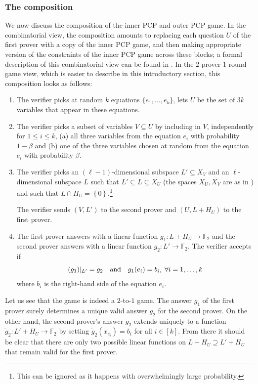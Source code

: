 \documentclass{toc}
\newcommand\set[1]{{\left\{ #1 \right\}}}
\renewcommand\leq{\leqslant}
\renewcommand\subset{\subseteq}
\renewcommand\supset{\supseteq}
\def\F{\mathbb{F}}
\begin{document}
\subsubsection{The composition}
\def\F{\mathbb{F}}
We now discuss the composition of the inner PCP and outer PCP game. In the combinatorial view, the composition amounts to
replacing each question $U$ of the first prover with a copy of the inner PCP game, and then making appropriate version of
the constraints of the inner PCP game across these blocks; a formal description of this combinatorial view can be found
in . In the $2$-prover-$1$-round game view, which is easier to describe in this introductory section,
this composition looks as follows:
\begin{enumerate}
\item The verifier picks at random $k$ equations $\{e_1,\ldots, e_k \}$, lets $U$ be the set of $3k$ variables that appear in these equations.
%
\item The verifier picks a subset of variables $V \subseteq U$ by including in $V$, independently for $1 \leq i \leq k$,
     (a) all three variables from the equation $e_i$  with probability $1-\beta$ and (b)
      one of the three
      variables chosen at random from the equation $e_i$ with probability $\beta$.

\item The verifier picks an $(\ell-1)$-dimensional subspace $L'
  \subset X_V$ and an $\ell$-dimensional subspace $L$ such that
  $L'\subset L \subset X_U$ (the spaces $X_U,X_V$ are as in
)  %
 and such that $L\cap H_U=\set 0$.\footnote{This can be
    ignored as it happens with overwhelmingly large probability.}

The verifier sends $(V,L')$ to the second prover and $(U,L + H_U)$ to the first prover.

\item\label{item:2} The first prover answers with a linear function $g_1:L+H_U \to \F_2$ and the second prover answers with a linear function $g_2:L'\to\F_2$.
    The verifier accepts if \[ (g_1)|_{L'} = g_2 \quad\hbox{and}\quad
 g_1(e_i)=b_i,\;\forall i=1,\ldots,k\]
    where $b_i$ is the right-hand side of the equation $e_i$.
\end{enumerate}

Let us see that the game is indeed a $2$-to-$1$ game. The answer $g_1$ of the first prover surely determines a unique valid answer  $g_2$ for the second prover. On the other hand, the second prover's answer $g_2$ extends uniquely to a function $\tilde g_2:L'+H_U\to\F_2$ by setting $\tilde g_2(x_{e_i})=b_i $ for all $i\in[k]$. From there it should be clear that there are only two possible linear functions on $L+H_U \supset L'+H_U$ that remain valid for the first prover.
\end{document}
